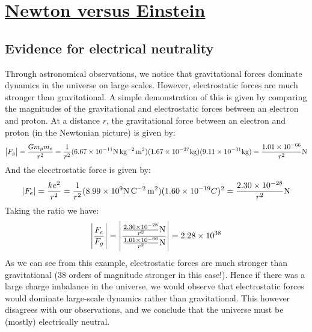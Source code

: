 \section[Newton versus Einstein]{\hyperlink{toc}{Newton versus Einstein}}

\subsection{Evidence for electrical neutrality}
Through astronomical observations, we notice that gravitational forces dominate dynamics in the universe on large scales. However, electrostatic forces are much stronger than gravitational. A simple demonstration of this is given by comparing the magnitudes of the gravitational and electrostatic forces between an electron and proton. At a distance $r$, the gravitational force between an electron and proton (in the Newtonian picture) is given by:
\begin{equation}
    \abs{F_g} = \frac{Gm_p m_e}{r^2} = \frac{1}{r^2}(6.67 \times 10^{-11} \si{N.kg^{-2}.m^2})(1.67 \times 10^{-27} \si{kg})(9.11 \times 10^{-31}\si{kg}) = \frac{1.01 \times 10^{-66}}{r^2} \si{N}
\end{equation}
And the elecctrostatic force is given by:
\begin{equation}
    \abs{F_e} = \frac{k e^2}{r^2} = \frac{1}{r^2}(8.99 \times 10^{9} \si{N.C^{-2}.m^2})(1.60 \times 10^{-19} C)^2 = \frac{2.30\times 10^{-28}}{r^2} \si{N}
\end{equation}
Taking the ratio we have:
\begin{equation}
    \abs{\frac{F_e}{F_g}} = \abs{\frac{\frac{2.30\times 10^{-28}}{r^2} \si{N}}{\frac{1.01 \times 10^{-66}}{r^2} \si{N}}} = 2.28 \times 10^{38}
\end{equation}
As we can see from this example, electrostatic forces are much stronger than gravitational (38 orders of magnitude stronger in this case!). Hence if there was a large charge imbalance in the universe, we would observe that electrostatic forces would dominate large-scale dynamics rather than gravitational. This however disagrees with our observations, and we conclude that the universe must be (mostly) electrically neutral.

